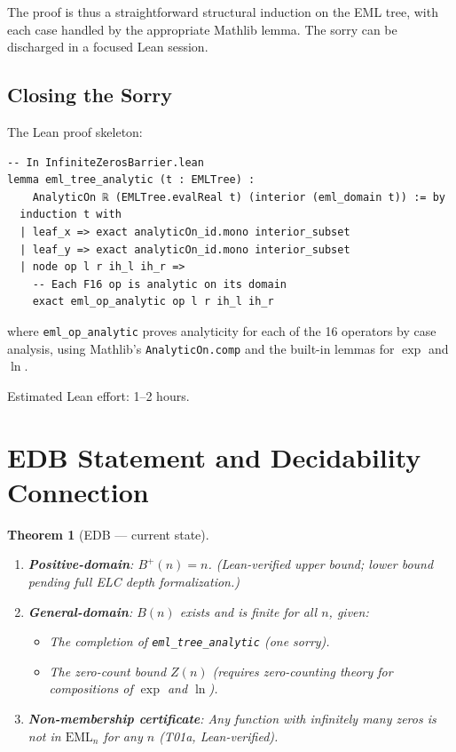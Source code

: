 \documentclass[12pt]{article}
\newtheorem{theorem}{Theorem}
\theoremstyle{definition}
\begin{document}
The proof is thus a straightforward structural induction on the EML tree, with
each case handled by the appropriate Mathlib lemma.  The sorry can be discharged
in a focused Lean session.

\subsection{Closing the Sorry}

The Lean proof skeleton:

\begin{verbatim}
-- In InfiniteZerosBarrier.lean
lemma eml_tree_analytic (t : EMLTree) :
    AnalyticOn ℝ (EMLTree.evalReal t) (interior (eml_domain t)) := by
  induction t with
  | leaf_x => exact analyticOn_id.mono interior_subset
  | leaf_y => exact analyticOn_id.mono interior_subset
  | node op l r ih_l ih_r =>
    -- Each F16 op is analytic on its domain
    exact eml_op_analytic op l r ih_l ih_r
\end{verbatim}

where \texttt{eml\_op\_analytic} proves analyticity for each of the 16 operators
by case analysis, using Mathlib's \texttt{AnalyticOn.comp} and the built-in
lemmas for $\exp$ and $\ln$.

Estimated Lean effort: 1–2 hours.

\section{EDB Statement and Decidability Connection}

\begin{theorem}[EDB — current state]
\label{thm:edb}
\begin{enumerate}
  \item \textbf{Positive-domain}: $B^+(n) = n$.  (Lean-verified upper bound;
    lower bound pending full ELC depth formalization.)
  \item \textbf{General-domain}: $B(n)$ exists and is finite for all $n$,
    given:
    \begin{itemize}
      \item The completion of \texttt{eml\_tree\_analytic} (one sorry).
      \item The zero-count bound $Z(n)$ (requires zero-counting theory for
        compositions of $\exp$ and $\ln$).
    \end{itemize}
  \item \textbf{Non-membership certificate}: Any function with infinitely many
    zeros is not in $\mathrm{EML}_n$ for any $n$ (T01a, Lean-verified).
\end{enumerate}
\end{theorem}
\end{document}
